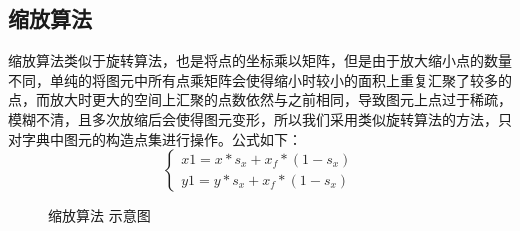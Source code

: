 \documentclass[a4paper,UTF8]{article}
\theoremstyle{definition}
\begin{document}
\subsection{缩放算法}
缩放算法类似于旋转算法，也是将点的坐标乘以矩阵，但是由于放大缩小点的数量不同，单纯的将图元中所有点乘矩阵会使得缩小时较小的面积上重复汇聚了较多的点，而放大时更大的空间上汇聚的点数依然与之前相同，导致图元上点过于稀疏，模糊不清，且多次放缩后会使得图元变形，所以我们采用类似旋转算法的方法，只对字典中图元的构造点集进行操作。公式如下：
\begin{equation}
\left\{
\begin{aligned}
x1=x*s_{x}+x_{f}*(1-s_{x})\\
y1=y*s_{x}+x_{f}*(1-s_{x})
\end{aligned}
\right.
\end{equation}
\begin{figure}[htbp]
\centering    %
 
 
\caption{缩放算法 示意图} %
\label{x910}  %
\end{figure}
\end{document}
